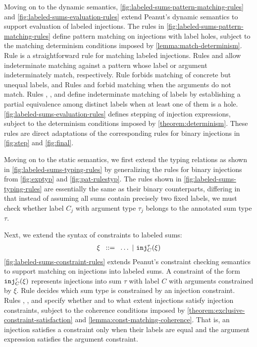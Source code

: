 
Moving on to the dynamic semantics, \autoref{fig:labeled-sums-pattern-matching-rules} and \autoref{fig:labeled-sums-evaluation-rules}
extend Peanut's dynamic semantics to support evaluation of labeled injections.
The rules in \autoref{fig:labeled-sums-pattern-matching-rules} define pattern matching on injections with label holes,
subject to the matching determinism conditions imposed by \autoref{lemma:match-determinism}.
Rule \MInj is a straightforward rule for matching labeled injections.
Rules \MMInjTag and \MMInjArg allow indeterminate matching against a pattern whose label or argument indeterminately match, respectively.
Rule \NMInj forbids matching of concrete but unequal labels, and
Rules \NMInjTag and \NMInjArg forbid matching when the arguments do not match.
Rules \TMMSym, \TMMHole, and \TMMEHole define indeterminate matching of labels
by establishing a partial equivalence among distinct labels when at least one of them is a hole.
\autoref{fig:labeled-sums-evaluation-rules} defines stepping of injection expressions,
subject to the determinism conditions imposed by \autoref{theorem:determinism}.
These rules are direct adaptations of the corresponding rules for binary injections in \autoref{fig:step} and \autoref{fig:final}.



Moving on to the static semantics, we first extend the typing relations as shown in \autoref{fig:labeled-sums-typing-rules}
by generalizing the rules for binary injections from \autoref{fig:exptyp} and \autoref{fig:pat-rulestyp}.
The rules shown in \autoref{fig:labeled-sums-typing-rules} are essentially the same as their binary counterparts,
differing in that instead of assuming all sums contain precisely two fixed labels,
we must check whether label $C_j$ with argument type $\tau_j$ belongs to the annotated sum type $\tau$.


Next, we extend the syntax of constraints to labeled sums:
\[
  \arraycolsep=4pt\begin{array}{lll}
    \xi & ::= & \ldots ~\vert~ \cinj{C}{\tau}{\xi}
  \end{array}
\]
\autoref{fig:labeled-sums-constraint-rules} extends Peanut's constraint checking semantics to support matching on injections into labeled sums.
A constraint of the form $\mathtt{inj}_{C}^{\tau}(\xi)$ represents injections into sum $\tau$ with label $C$ with arguments constrained by $\xi$.
Rule \CTInj decides which sum type is constrained by an injection constraint.
Rules \CSInj, \CMSInjTag, and \CMSInjArg specify whether and to what extent injections satisfy injection constraints,
subject to the coherence conditions imposed by \autoref{theorem:exclusive-constraint-satisfaction} and \autoref{lemma:const-matching-coherence}.
That is, an injection satisfies a constraint only when their labels are equal and the argument expression satisfies the argument constraint.


